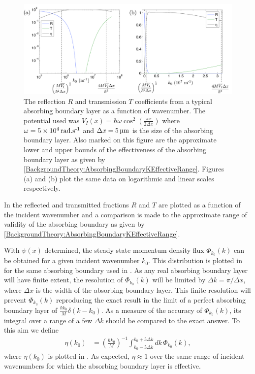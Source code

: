 \begin{figure}
    \centering
    \includegraphics[width=14cm]{AbsorbingBoundaryLayerEffectiveness}
    \caption{\label{MethodsAppendix:AbsorbingBoundaryLayerEffectiveness} The reflection $R$ and transmission $T$ coefficients from a typical absorbing boundary layer as a function of wavenumber. The potential used was $\displaystyle V_I(x) = \hbar \omega \cos^2\left( \frac{\pi x}{2 \Delta x} \right)$ where $\omega = \unit[5 \times 10^4]{rad.s\textsuperscript{-1}}$ and $\Delta x = \unit[5]{\micro m}$ is the size of the absorbing boundary layer. Also marked on this figure are the approximate lower and upper bounds of the effectiveness of the absorbing boundary layer as given by \eqref{BackgroundTheory:AbsorbingBoundaryKEffectiveRange}.  Figures (a) and (b) plot the same data on logarithmic and linear scales respectively.}
\end{figure}

In  the reflected and transmitted fractions $R$ and $T$ are plotted as a function of the incident wavenumber and a comparison is made to the approximate range of validity of the absorbing boundary as given by \eqref{BackgroundTheory:AbsorbingBoundaryKEffectiveRange}. 


With $\psi(x)$ determined, the steady state momentum density flux $\Phi_{k_0}(k)$ can be obtained for a given incident wavenumber $k_0$. This distribution is plotted in  for the same absorbing boundary used in . As any real absorbing boundary layer will have finite extent, the resolution of $\Phi_{k_0}(k)$ will be limited by $\Delta k = \pi/\Delta x$, where $\Delta x$ is the width of the absorbing boundary layer. This finite resolution will prevent $\Phi_{k_0}(k)$ reproducing the exact result in the limit of a perfect absorbing boundary layer of $\displaystyle \frac{\hbar k_0}{M}\delta(k - k_0)$. As a measure of the accuracy of $\Phi_{k_0}(k)$, its integral over a range of a few $\Delta k$ should be compared to the exact answer. To this aim we define
\begin{align}
    \eta(k_0) &= \left(\frac{\hbar k_0}{M}\right)^{-1} \int_{k_0-5\Delta k}^{k_0 + 5\Delta k} dk\, \Phi_{k_0}(k),
\end{align}
where $\eta(k_0)$ is plotted in . As expected, $\eta \approx 1$ over the same range of incident wavenumbers for which the absorbing boundary layer is effective.

